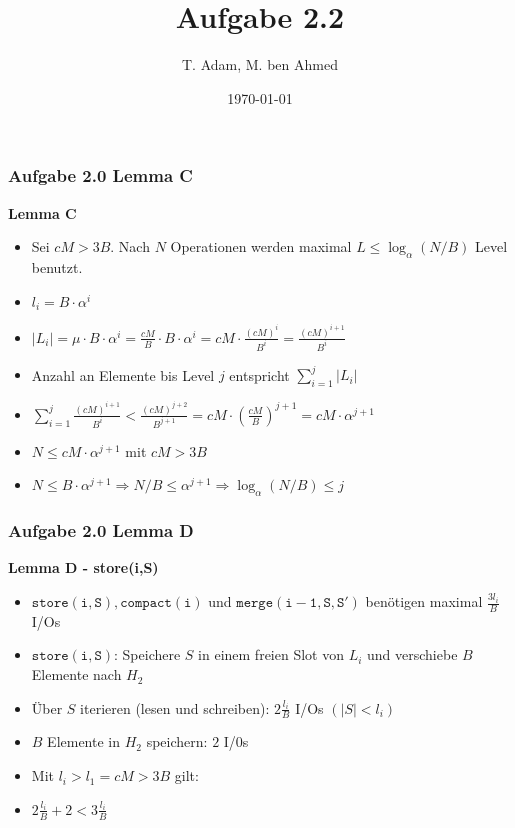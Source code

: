 \documentclass[aspectratio=169]{beamer}
\title[Aufgabe 1.1]{Aufgabe 2.2} %
\author{T. Adam, M. ben Ahmed} %
\institute[UOS] %
{

Universität Osnabrück \\ %

\medskip
\textit{Algorithm Engineering} %


}
\date{\today} %
\begin{document}
\begin{frame}
\titlepage %
\end{frame}





\begin{frame}
	\frametitle{Aufgabe 2.0 Lemma C}
	
	\textbf{Lemma C}
	\begin{itemize}
		\item Sei $cM > 3B$. Nach $N$ Operationen werden maximal $L \leq \log_{\alpha}(N/B)$ Level benutzt.
		\item $l_i = B \cdot \alpha^i$
		\item $|L_i| = \mu \cdot B \cdot \alpha^i = \frac{cM}{B} \cdot B \cdot \alpha^i = cM \cdot \frac{(cM)^i}{B^{i}} = \frac{(cM)^{i+1}}{B^{i}}$
		\item Anzahl an Elemente bis Level $j$ entspricht $ \sum_{i = 1}^{j} |L_i|$
		\item $\sum_{i = 1}^{j} \frac{(cM)^{i+1}}{B^{i}} < \frac{(cM)^{j+2}}{B^{j+1}} = cM \cdot (\frac{cM}{B})^{j+1} = cM \cdot \alpha^{j+1}$
		\item $N \leq cM \cdot \alpha^{j+1}$ mit $cM > 3B$
		\item $N \leq B \cdot \alpha^{j+1} \Rightarrow N/B \leq \alpha^{j+1} \Rightarrow \log_{\alpha}(N/B) \leq j$
	\end{itemize}
	
	\end{frame}

\begin{frame}
\frametitle{Aufgabe 2.0 Lemma D}

\textbf{Lemma D - store(i,S)}
\begin{itemize}
	\item $\mathtt{store(i,S), compact(i)}$ und $\mathtt{merge(i-1,S,S')}$ benötigen maximal $\frac{3l_i}{B}$ I/Os
	\item $\mathtt{store(i,S)}$: Speichere $S$ in einem freien Slot von $L_i$ und verschiebe $B$ Elemente nach $H_2$
	\item Über $S$ iterieren (lesen und schreiben): $2\frac{l_i}{B}$ I/Os $(|S| < l_i)$
	\item $B$ Elemente in $H_2$ speichern: $2$ I/0s
	\item Mit $l_i > l_1 = cM > 3B$ gilt:
	\item $2\frac{l_i}{B} + 2 < 3\frac{l_i}{B}$
	
\end{itemize}

\end{frame}
\end{document}
